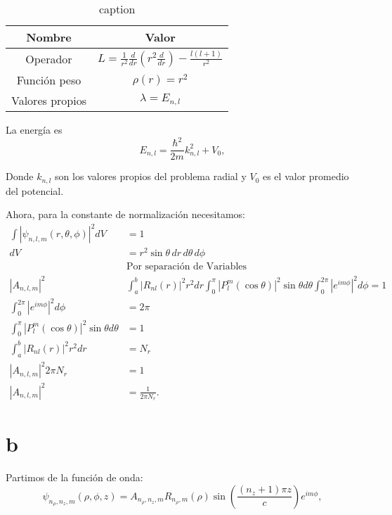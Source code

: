 \documentclass{report}
\begin{document}
\begin{enumerate}
\begin{table}[H]
  \centering
  \caption{caption}
  \label{tab:label}
  \begin{tabular}{c|c}
    \hline
    Nombre & Valor\\
    \hline
    Operador &  \( L = \frac{1}{r^2} \frac{d}{dr} \left( r^2 \frac{d}{dr} \right) - \frac{l(l+1)}{r^2} \)\\
    Función peso & \( \rho(r) = r^2 \)\\
    Valores propios & \( \lambda = E_{n,l} \) \\
    \hline
  \end{tabular}
\end{table}
\end{enumerate}

La energía es
\[
E_{n,l} = \frac{\hbar^2}{2m} k_{n,l}^2 + V_0,
\]

Donde \( k_{n,l} \) son los valores propios del problema radial y \( V_0 \) es el valor promedio del potencial.

Ahora, para la constante de normalización necesitamos:
\begin{align*}
  \int |\psi_{n,l,m}(r, \theta, \phi)|^2 dV &= 1\\
  dV &= r^2 \sin\theta \, dr \, d\theta \, d\phi\\
&\text{Por separación de Variables}\\
  |A_{n,l,m}|^2 & \int_a^b |R_{nl}(r)|^2 r^2 dr \int_0^\pi |P_l^m(\cos\theta)|^2 \sin\theta d\theta \int_0^{2\pi} |e^{im\phi}|^2 d\phi = 1\\
  \int_0^{2\pi} |e^{im\phi}|^2 d\phi &= 2\pi\\
  \int_0^\pi |P_l^m(\cos\theta)|^2 \sin\theta d\theta &= 1\\
  \int_a^b |R_{nl}(r)|^2 r^2 dr &= N_r\\
  |A_{n,l,m}|^2 2\pi N_r &= 1 \\
  |A_{n,l,m}|^2 &= \frac{1}{2\pi N_r}
.\end{align*}

\section{b}

Partimos de la función de onda:
\[
\psi_{n_\rho, n_z, m}(\rho, \phi, z) = A_{n_\rho, n_z, m} R_{n_\rho, m}(\rho) \sin\left(\frac{(n_z + 1)\pi z}{c}\right) e^{im\phi},
\]
\end{document}
